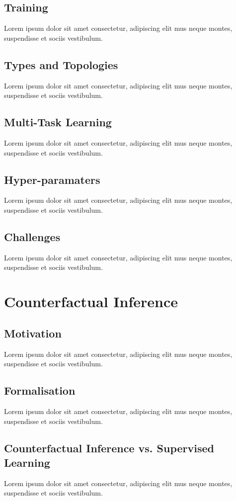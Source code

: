 \subsection{Training}
Lorem ipsum dolor sit amet consectetur, adipiscing elit mus neque montes, suspendisse et sociis vestibulum.

\subsection{Types and Topologies}
Lorem ipsum dolor sit amet consectetur, adipiscing elit mus neque montes, suspendisse et sociis vestibulum.

\subsection{Multi-Task Learning}
Lorem ipsum dolor sit amet consectetur, adipiscing elit mus neque montes, suspendisse et sociis vestibulum.

\subsection{Hyper-paramaters}
Lorem ipsum dolor sit amet consectetur, adipiscing elit mus neque montes, suspendisse et sociis vestibulum.

\subsection{Challenges}
Lorem ipsum dolor sit amet consectetur, adipiscing elit mus neque montes, suspendisse et sociis vestibulum.


\section{Counterfactual Inference}
\subsection{Motivation}
Lorem ipsum dolor sit amet consectetur, adipiscing elit mus neque montes, suspendisse et sociis vestibulum.

\subsection{Formalisation}
Lorem ipsum dolor sit amet consectetur, adipiscing elit mus neque montes, suspendisse et sociis vestibulum.

\subsection{Counterfactual Inference vs. Supervised Learning}
Lorem ipsum dolor sit amet consectetur, adipiscing elit mus neque montes, suspendisse et sociis vestibulum.

